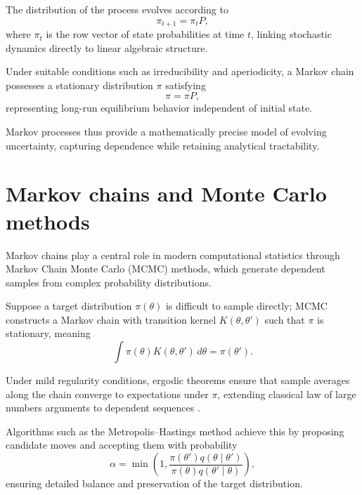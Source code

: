 \medskip

The distribution of the process evolves according to
\[
\pi_{t+1} = \pi_t P,
\]
where \(\pi_t\) is the row vector of state probabilities at time \(t\), linking stochastic dynamics directly to linear algebraic structure. 

\medskip

Under suitable conditions such as irreducibility and aperiodicity, a Markov chain possesses a stationary distribution \(\pi\) satisfying 
\[
\pi = \pi P,
\]
representing long-run equilibrium behavior independent of initial state. 

\medskip

Markov processes thus provide a mathematically precise model of evolving uncertainty, capturing dependence while retaining analytical tractability. 


\section{Markov chains and Monte Carlo methods}

Markov chains play a central role in modern computational statistics through Markov Chain Monte Carlo (MCMC) methods, which generate dependent samples from complex probability distributions. 

\medskip

Suppose a target distribution \(\pi(\theta)\) is difficult to sample directly; MCMC constructs a Markov chain with transition kernel \(K(\theta,\theta')\) such that \(\pi\) is stationary, meaning 
\[
\int \pi(\theta)K(\theta,\theta')\,d\theta = \pi(\theta').
\]

\medskip

Under mild regularity conditions, ergodic theorems ensure that sample averages along the chain converge to expectations under \(\pi\), extending classical law of large numbers arguments to dependent sequences \cite{markov_1906_extension}. 

\medskip

Algorithms such as the Metropolis–Hastings method achieve this by proposing candidate moves and accepting them with probability
\[
\alpha = \min\!\left(1,\frac{\pi(\theta')q(\theta \mid \theta')}{\pi(\theta)q(\theta' \mid \theta)}\right),
\]
ensuring detailed balance and preservation of the target distribution. 

\medskip

